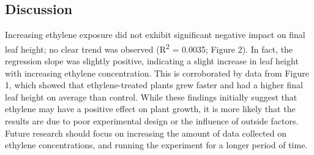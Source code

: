 \documentclass{report}
\begin{document}
\begin{multicols}{3}
  \section*{Discussion}
  Increasing ethylene exposure did not exhibit significant negative impact on final leaf height; no clear trend was observed (R\textsuperscript{2} = 0.0035; Figure 2). In fact, the regression slope was slightly positive, indicating a slight increase in leaf height with increasing ethylene concentration. This is corroborated by data from Figure 1, which showed that ethylene-treated plants grew faster and had a higher final leaf height on average than control. While these findings initially suggest that ethylene may have a positive effect on plant growth, it is more likely that the results are due to poor experimental design or the influence of outside factors. Future research should focus on increasing the amount of data collected on ethylene concentrations, and running the experiment for a longer period of time.
  
\end{multicols}

\clearpage


\printbibliography
\end{document}

